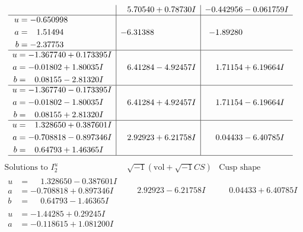 \documentclass[1p]{elsarticle_modified}
\theoremstyle{definition}
\newcommand{\I}{\sqrt{-1}}
\begin{document}
$$\begin{array}{c|c|c}
 & \phantom{-}5.70540 + 0.78730 I & -0.442956 - 0.061759 I \\ \hline\begin{aligned}
u &= -0.650998\phantom{ +0.000000I} \\
a &= \phantom{-}1.51494\phantom{ +0.000000I} \\
b &= -2.37753\phantom{ +0.000000I}\end{aligned}
 & -6.31388\phantom{ +0.000000I} & -1.89280\phantom{ +0.000000I} \\ \hline\begin{aligned}
u &= -1.367740 + 0.173395 I \\
a &= -0.01802 + 1.80035 I \\
b &= \phantom{-}0.08155 - 2.81320 I\end{aligned}
 & \phantom{-}6.41284 - 4.92457 I & \phantom{-}1.71154 + 6.19664 I \\ \hline\begin{aligned}
u &= -1.367740 - 0.173395 I \\
a &= -0.01802 - 1.80035 I \\
b &= \phantom{-}0.08155 + 2.81320 I\end{aligned}
 & \phantom{-}6.41284 + 4.92457 I & \phantom{-}1.71154 - 6.19664 I \\ \hline\begin{aligned}
u &= \phantom{-}1.328650 + 0.387601 I \\
a &= -0.708818 - 0.897346 I \\
b &= \phantom{-}0.64793 + 1.46365 I\end{aligned}
 & \phantom{-}2.92923 + 6.21758 I & \phantom{-}0.04433 - 6.40785 I\\
 \hline 
 \end{array}$$\newpage$$\begin{array}{c|c|c}  
\text{Solutions to }I^u_{2}& \I (\text{vol} + \sqrt{-1}CS) & \text{Cusp shape}\\
 \hline 
\begin{aligned}
u &= \phantom{-}1.328650 - 0.387601 I \\
a &= -0.708818 + 0.897346 I \\
b &= \phantom{-}0.64793 - 1.46365 I\end{aligned}
 & \phantom{-}2.92923 - 6.21758 I & \phantom{-}0.04433 + 6.40785 I \\ \hline\begin{aligned}
u &= -1.44285 + 0.29245 I \\
a &= -0.118615 + 1.081200 I \\

\end{aligned}
\end{array}$$
\end{document}
